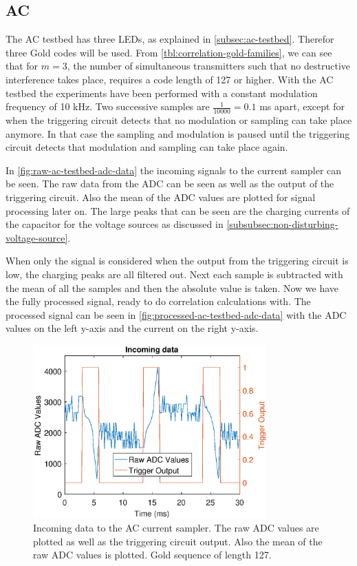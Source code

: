 
\subsection{AC}


The AC testbed has three LEDs, as explained in \autoref{subsec:ac-testbed}.
Therefor three Gold codes will be used.
From \autoref{tbl:correlation-gold-families}, we can see that for $m = 3$, the number of simultaneous transmitters such that no destructive interference takes place, requires a code length of 127 or higher.
With the AC testbed the experiments have been performed with a constant modulation frequency of 10 kHz.
Two successive samples are $\frac{1}{10000} = 0.1$ ms apart, except for when the triggering circuit detects that no modulation or sampling can take place anymore.
In that case the sampling and modulation is paused until the triggering circuit detects that modulation and sampling can take place again.


In \autoref{fig:raw-ac-testbed-adc-data} the incoming signals to the current sampler can be seen.
The raw data from the ADC can be seen as well as the output of the triggering circuit.
Also the mean of the ADC values are plotted for signal processing later on.
The large peaks that can be seen are the charging currents of the capacitor for the voltage sources as discussed in \autoref{subsubsec:non-disturbing-voltage-source}.

When only the signal is considered when the output from the triggering circuit is low, the charging peaks are all filtered out.
Next each sample is subtracted with the mean of all the samples and then the absolute value is taken.
Now we have the fully processed signal, ready to do correlation calculations with.
The processed signal can be seen in \autoref{fig:processed-ac-testbed-adc-data} with the ADC values on the left y-axis and the current on the right y-axis.



\begin{figure}
  \centering
  \includegraphics[width=0.8\textwidth]{chapters/evaluation-chapters/hardware/ac/raw-ac-testbed-adc-data.eps}
    \caption{Incoming data to the AC current sampler. The raw ADC values are plotted as well as the triggering circuit output. Also the mean of the raw ADC values is plotted. Gold sequence of length 127.}
  \label{fig:raw-ac-testbed-adc-data}
\end{figure}


